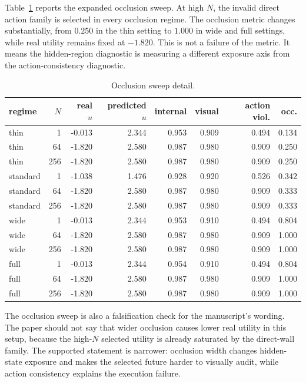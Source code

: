 \documentclass{article}
\begin{document}
Table~\ref{tab:occlusion-full} reports the expanded occlusion sweep. At high \(N\), the invalid direct action family is selected in every occlusion regime. The occlusion metric changes substantially, from \(0.250\) in the thin setting to \(1.000\) in wide and full settings, while real utility remains fixed at \(-1.820\). This is not a failure of the metric. It means the hidden-region diagnostic is measuring a different exposure axis from the action-consistency diagnostic.

\begin{table}[tbp]
  \centering
  \small
  \caption{Occlusion sweep detail.}
  \label{tab:occlusion-full}
  \begin{tabular}{@{}lrrrrrrr@{}}
    \toprule
    regime & \(N\) & real \(u\) & predicted \(u\) & internal & visual & action viol. & occ. \\
    \midrule
    thin & 1 & -0.013 & 2.344 & 0.953 & 0.909 & 0.494 & 0.134 \\
    thin & 64 & -1.820 & 2.580 & 0.987 & 0.980 & 0.909 & 0.250 \\
    thin & 256 & -1.820 & 2.580 & 0.987 & 0.980 & 0.909 & 0.250 \\
    standard & 1 & -1.038 & 1.476 & 0.928 & 0.920 & 0.526 & 0.342 \\
    standard & 64 & -1.820 & 2.580 & 0.987 & 0.980 & 0.909 & 0.333 \\
    standard & 256 & -1.820 & 2.580 & 0.987 & 0.980 & 0.909 & 0.333 \\
    wide & 1 & -0.013 & 2.344 & 0.953 & 0.910 & 0.494 & 0.804 \\
    wide & 64 & -1.820 & 2.580 & 0.987 & 0.980 & 0.909 & 1.000 \\
    wide & 256 & -1.820 & 2.580 & 0.987 & 0.980 & 0.909 & 1.000 \\
    full & 1 & -0.013 & 2.344 & 0.954 & 0.910 & 0.494 & 0.804 \\
    full & 64 & -1.820 & 2.580 & 0.987 & 0.980 & 0.909 & 1.000 \\
    full & 256 & -1.820 & 2.580 & 0.987 & 0.980 & 0.909 & 1.000 \\
    \bottomrule
  \end{tabular}
\end{table}

The occlusion sweep is also a falsification check for the manuscript's wording. The paper should not say that wider occlusion causes lower real utility in this setup, because the high-\(N\) selected utility is already saturated by the direct-wall family. The supported statement is narrower: occlusion width changes hidden-state exposure and makes the selected future harder to visually audit, while action consistency explains the execution failure.
\end{document}
